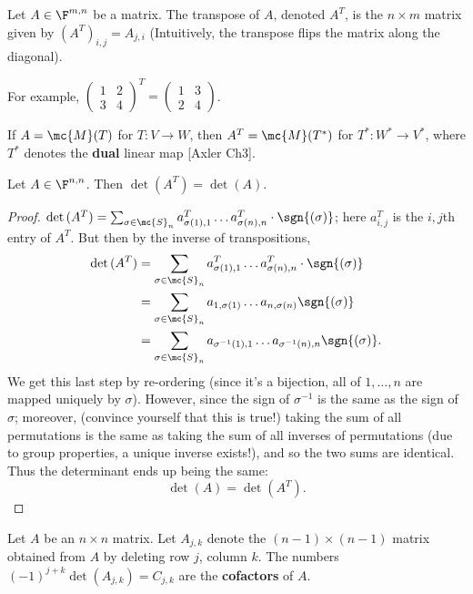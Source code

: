 \documentclass[math0540-lecture-notes.tex]{subfiles}
\begin{document}
\begin{definition}[Transpose]{}
  Let $A\in \F^{m,n}$ be a matrix. The transpose of $A$, denoted $A^T$, is the $n\times m$ matrix
  given by $(A^T)_{i,j}=A_{j,i}$ (Intuitively, the transpose flips the matrix along the diagonal).
\end{definition}
For example, $\begin{pmatrix} 1&2\\3&4 \end{pmatrix} ^T=\begin{pmatrix} 1&3\\2&4 \end{pmatrix}
$. 
\begin{remark}
  If $A=\mc{M}(T)$ for $T:V\to W$, then $A^T=\mc{M}(T^*)$ for $T^*:W^*\to V^*$, where $T^*$ denotes
  the \textbf{dual} linear map [Axler Ch3].
\end{remark}

\begin{proposition}{}
  Let $A\in \F^{n,n}$. Then $\det{(A^T)}=\det{(A)}$.
\end{proposition}
\begin{proof}[Proof]
  $\det{(A^T)}=\sum_{\sigma\in \mc{S}_n}a_{\sigma(1),1}^T\ldots a_{\sigma(n),n}^T\cdot
  \sgn{(\sigma)}$; here $a_{i,j}^T$ is the $i,j$th entry of $A^T$. But then by the inverse of
  transpositions,
  \begin{align*}
    \det{(A^T)}&=\sum_{\sigma\in \mc{S}_n}a_{\sigma(1),1}^T\ldots
    a_{\sigma(n),n}^T\cdot\sgn{(\sigma)}\\
                &=\sum_{\sigma\in \mc{S}_n}a_{1,\sigma(1)}\ldots a_{n,\sigma(n)}\sgn{(\sigma)}\\
                &=\sum_{\sigma\in \mc{S}_n}a_{\sigma^{-1}(1),1}\ldots a_{\sigma^{-1}(n),n}\sgn{(\sigma)}
              .\end{align*}
  We get this last step by re-ordering (since it's a bijection, all of $1,\ldots,n$ are mapped
  uniquely by $\sigma$). However, since the sign of $\sigma^{-1}$ is the same as the sign of
  $\sigma$; moreover, (convince yourself that this is true!) taking the sum of all permutations is
  the same as taking the sum of all inverses of permutations (due to group properties, a unique
  inverse exists!), and so the two sums are identical. Thus the determinant ends up being the same: \[
    \det{(A)}=\det{(A^T)}
  .\] 
\end{proof}

\begin{definition}[Cofactors]{}
  Let $A$ be an $n\times n$ matrix. Let $A_{j,k}$ denote the $(n-1)\times (n-1)$ matrix obtained
  from $A$ by deleting row $j$, column $k$. The numbers $(-1)^{j+k}\det{(A_{j,k})}=C_{j,k}$ are the
  \textbf{cofactors} of $A$.
\end{definition}
\end{document}
